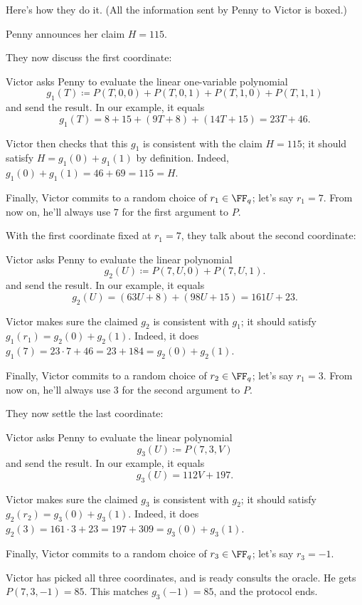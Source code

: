 \documentclass[11pt]{scrreprt}
\begin{document}
Here's how they do it.
(All the information sent by Penny to Victor is boxed.)

\begin{enumerate}
  \ii Penny announces her claim $\boxed{H = 115}$.

  \ii They now discuss the first coordinate:
  \begin{itemize}
    \ii Victor asks Penny to evaluate the linear one-variable polynomial
    \[ g_1(T) \coloneqq P(T,0,0) + P(T,0,1) + P(T,1,0) + P(T,1,1) \]
    and send the result. In our example, it equals
    \[ g_1(T) = 8 + 15 + (9T+8) + (14T+15) = \boxed{23T+46}. \]

    \ii Victor then checks that this $g_1$ is consistent with the claim $H=115$;
    it should satisfy $H = g_1(0) + g_1(1)$ by definition.
    Indeed, $g_1(0)+g_1(1) = 46+69 = 115 = H$.

    \ii Finally, Victor commits to a random choice of $r_1 \in \FF_q$; let's say $r_1 = 7$.
    From now on, he'll always use $7$ for the first argument to $P$.
  \end{itemize}

  \ii With the first coordinate fixed at $r_1 = 7$, they talk about the second coordinate:
  \begin{itemize}
    \ii Victor asks Penny to evaluate the linear polynomial
    \[ g_2(U) \coloneqq P(7,U,0) + P(7,U,1). \]
    and send the result. In our example, it equals
    \[ g_2(U) = (63U+8) + (98U+15) = \boxed{161U + 23}. \]

    \ii Victor makes sure the claimed $g_2$ is consistent with $g_1$;
    it should satisfy $g_1(r_1) = g_2(0)+g_2(1)$.
    Indeed, it does $g_1(7) = 23 \cdot 7 + 46 = 23 + 184 = g_2(0) + g_2(1)$.

    \ii Finally, Victor commits to a random choice of $r_2 \in \FF_q$; let's say $r_1 = 3$.
    From now on, he'll always use $3$ for the second argument to $P$.
  \end{itemize}

  \ii They now settle the last coordinate:
  \begin{itemize}
    \ii Victor asks Penny to evaluate the linear polynomial
    \[ g_3(U) \coloneqq P(7,3,V) \]
    and send the result. In our example, it equals
    \[ g_3(U) = \boxed{112V+197}. \]

    \ii Victor makes sure the claimed $g_3$ is consistent with $g_2$;
    it should satisfy $g_2(r_2) = g_3(0)+g_3(1)$.
    Indeed, it does $g_2(3) = 161 \cdot 3 + 23 = 197 + 309 = g_3(0) + g_3(1)$.

    \ii Finally, Victor commits to a random choice of $r_3 \in \FF_q$; let's say $r_3 = -1$.
  \end{itemize}

  \ii Victor has picked all three coordinates, and is ready consults the oracle.
  He gets $P(7,3,-1) = 85$.
  This matches $g_3(-1) = 85$, and the protocol ends.
\end{enumerate}
\end{document}

